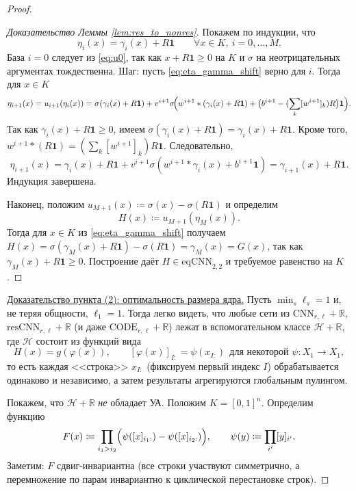\documentclass[../NDCNNAI_main.tex]{subfiles}
\begin{document}
\begin{proof}
\begin{proof}[Доказательство Леммы \ref{lem:res_to_nonres}]
Покажем по индукции, что
\begin{equation}
\eta_i(x)=\gamma_i(x)+R\mathbf{1}\qquad \forall x\in K,\ i=0,\dots,M.
\label{eq:eta_gamma_shift}
\end{equation}
База $i=0$ следует из \eqref{eq:u0}, так как $x+R\mathbf{1}\ge 0$ на $K$ и $\sigma$ на неотрицательных аргументах тождественна.
Шаг: пусть \eqref{eq:eta_gamma_shift} верно для $i$. Тогда для $x\in K$
\[
\eta_{i+1}(x)=u_{i+1}(\eta_i(x))
=\sigma(\gamma_i(x)+R\mathbf{1})
+ v^{i+1}\sigma\!\Bigl(w^{i+1}*(\gamma_i(x)+R\mathbf{1}) + \bigl(b^{i+1}- (\sum_k [w^{i+1}]_k)R\bigr)\mathbf{1}\Bigr).
\]
Так как $\gamma_i(x)+R\mathbf{1}\ge 0$, имеем $\sigma(\gamma_i(x)+R\mathbf{1})=\gamma_i(x)+R\mathbf{1}$.
Кроме того, $w^{i+1}*(R\mathbf{1})=(\sum_k [w^{i+1}]_k)R\mathbf{1}$.
Следовательно,
\[
\eta_{i+1}(x)=\gamma_i(x)+R\mathbf{1}+v^{i+1}\sigma(w^{i+1}*\gamma_i(x)+b^{i+1}\mathbf{1})
=\gamma_{i+1}(x)+R\mathbf{1}.
\]
Индукция завершена.

Наконец, положим $u_{M+1}(x)\coloneq \sigma(x)-\sigma(R\mathbf{1})$ и определим
\[
H(x)\coloneq u_{M+1}(\eta_M(x)).
\]
Тогда для $x\in K$ из \eqref{eq:eta_gamma_shift} получаем
$H(x)=\sigma(\gamma_M(x)+R\mathbf{1})-\sigma(R\mathbf{1})=\gamma_M(x)=G(x)$, так как $\gamma_M(x)+R\mathbf{1}\ge 0$.
Построение даёт $H\in\mathrm{eqCNN}_{2,2}$ и требуемое равенство на $K$.
\end{proof}

\underline{Доказательство пункта (2): оптимальность размера ядра.}
Пусть $\min_s \ell_s=1$ и, не теряя общности, $\ell_1=1$.
Тогда легко видеть, что любые сети из $\mathrm{CNN}_{r,\ell}+\mathbb{R}$, $\mathrm{resCNN}_{r,\ell}+\mathbb{R}$ (и даже $\mathrm{CODE}_{r,\ell}+\mathbb{R}$)
лежат в вспомогательном классе $\mathcal{H}+\mathbb{R}$, где $\mathcal{H}$ состоит из функций вида
\[
H(x)= g(\varphi(x)),
\qquad
[\varphi(x)]_{I:}=\psi(x_{I:})\ \ \text{для некоторой }\psi:X_1\to X_1,
\]
то есть каждая <<строка>> $x_{I:}$ (фиксируем первый индекс $I$) обрабатывается одинаково и независимо, а затем результаты агрегируются глобальным пулингом.

Покажем, что $\mathcal{H}+\mathbb{R}$ \emph{не} обладает УА.
Положим $K=[0,1]^n$. Определим функцию
\[
F(x)\coloneq \prod_{i_1> i_2}\Bigl(\psi([x]_{i_1:})-\psi([x]_{i_2:})\Bigr),
\qquad
\psi(y)\coloneq \prod_{i'} [y]_{i'}.
\]
Заметим: $F$ сдвиг-инвариантна (все строки участвуют симметрично, а перемножение по парам инвариантно к циклической перестановке строк).


\end{proof}
\end{document}
